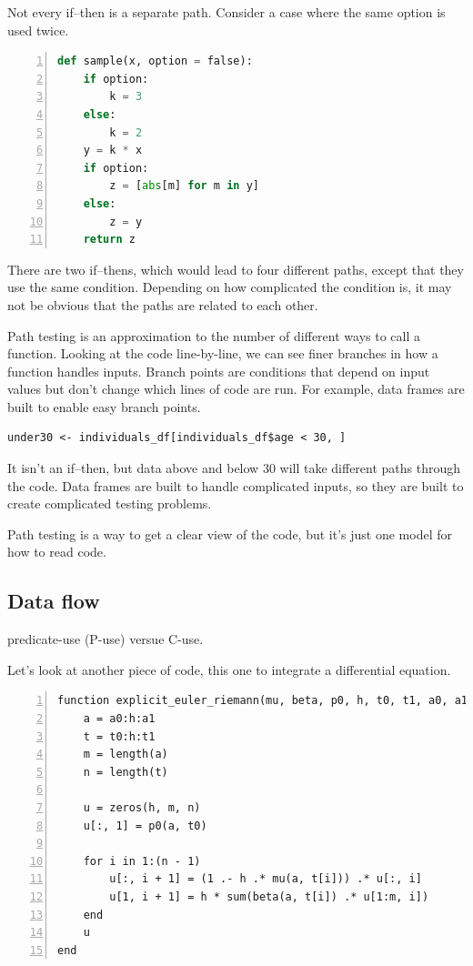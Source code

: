 \documentclass[fleqn,10pt]{olplainarticle}
\begin{document}
Not every if--then is a separate path. Consider a case where
the same option is used twice.

\begin{lstlisting}[language=Python,numbers=left]
def sample(x, option = false):
    if option:
        k = 3
    else:
        k = 2
    y = k * x
    if option:
        z = [abs[m] for m in y]
    else:
        z = y
    return z
\end{lstlisting}

\noindent{}There are two if--thens, which would lead to four different
paths, except that they use the same condition. Depending on
how complicated the condition is, it may not be obvious that
the paths are related to each other.

Path testing is an approximation to the number of different
ways to call a function. Looking at the code line-by-line,
we can see finer branches in how a function handles inputs.
Branch points are conditions that depend on input values
but don't change which lines of code are run. For example,
data frames are built to enable easy branch points.
\begin{lstlisting}
under30 <- individuals_df[individuals_df$age < 30, ]
\end{lstlisting}
It isn't an if--then, but data above and below 30 will take
different paths through the code. Data frames are built
to handle complicated inputs, so they are built to create
complicated testing problems.

Path testing is a way to get a clear view of
the code, but it's just one model for how to read code.

\subsection{Data flow}
predicate-use (P-use) versue C-use.

Let's look at another piece of code, this one to integrate
a differential equation.
\begin{lstlisting}[numbers=left]
function explicit_euler_riemann(mu, beta, p0, h, t0, t1, a0, a1)
    a = a0:h:a1
    t = t0:h:t1
    m = length(a)
    n = length(t)

    u = zeros(h, m, n)
    u[:, 1] = p0(a, t0)

    for i in 1:(n - 1)
        u[:, i + 1] = (1 .- h .* mu(a, t[i])) .* u[:, i]
        u[1, i + 1] = h * sum(beta(a, t[i]) .* u[1:m, i])
    end
    u
end
\end{lstlisting}
\end{document}
